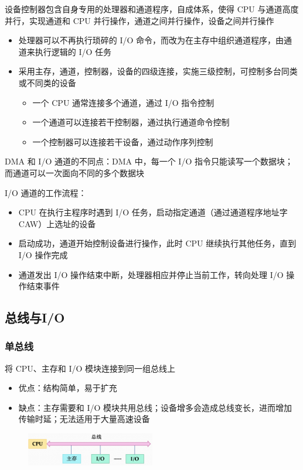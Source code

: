 \documentclass[cs4size,a4paper,10pt]{ctexart}
\begin{document}
	设备控制器包含自身专用的处理器和通道程序，自成体系，使得 CPU 与通道高度并行，实现通道和 CPU 并行操作，通道之间并行操作，设备之间并行操作
	\begin{itemize}
		\item 处理器可以不再执行琐碎的 I/O 命令，而改为在主存中组织通道程序，由通道来执行逻辑的 I/O 任务
		\item 采用主存，通道，控制器，设备的四级连接，实施三级控制，可控制多台同类或不同类的设备
		\begin{itemize}
			\item 一个 CPU 通常连接多个通道，通过 I/O 指令控制
			\item 一个通道可以连接若干控制器，通过执行通道命令控制
			\item 一个控制器可以连接若干设备，通过动作序列控制
		\end{itemize}
	\end{itemize}

	DMA 和 I/O 通道的不同点：DMA 中，每一个 I/O 指令只能读写一个数据块；而通道可以一次面向不同的多个数据块

	I/O 通道的工作流程：
	\begin{itemize}
		\item CPU 在执行主程序时遇到 I/O 任务，启动指定通道（通过通道程序地址字 CAW）上选址的设备
		\item 启动成功，通道开始控制设备进行操作，此时 CPU 继续执行其他任务，直到 I/O 操作完成
		\item 通道发出 I/O 操作结束中断，处理器相应并停止当前工作，转向处理 I/O 操作结束事件
	\end{itemize}

	\subsection{总线与I/O}
	\subsubsection{单总线}
	将 CPU、主存和 I/O 模块连接到同一组总线上
	\begin{itemize}
		\item 优点：结构简单，易于扩充
		\item 缺点：主存需要和 I/O 模块共用总线；设备增多会造成总线变长，进而增加传输时延；无法适用于大量高速设备
	\end{itemize}
	\begin{figure}[H]
		\centering
		\includegraphics[width=0.5\textwidth]{img/4.1.3.1}
	\end{figure}
\end{document}
